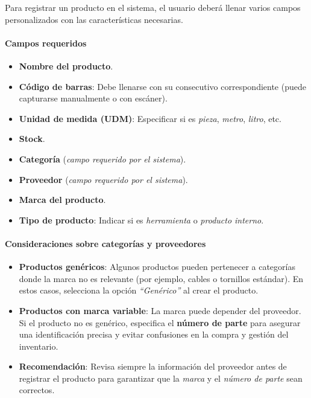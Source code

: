 \begin{justify}
Para registrar un producto en el sistema, el usuario deberá llenar varios campos personalizados con las características necesarias.
\end{justify}

\paragraph{Campos requeridos}

\begin{itemize}
  \item \textbf{Nombre del producto}.
  \item \textbf{Código de barras}: Debe llenarse con su consecutivo correspondiente (puede capturarse manualmente o con escáner).
  \item \textbf{Unidad de medida (UDM)}: Especificar si es \emph{pieza}, \emph{metro}, \emph{litro}, etc.
  \item \textbf{Stock}.
  \item \textbf{Categoría} (\emph{campo requerido por el sistema}).
  \item \textbf{Proveedor} (\emph{campo requerido por el sistema}).
  \item \textbf{Marca del producto}.
  \item \textbf{Tipo de producto}: Indicar si es \emph{herramienta} o \emph{producto interno}.
\end{itemize}


\paragraph{Consideraciones sobre categorías y proveedores}

\begin{itemize}
  \item \textbf{Productos genéricos}: Algunos productos pueden pertenecer a categorías donde la marca no es relevante (por ejemplo, cables o tornillos estándar). En estos casos, selecciona la opción \emph{“Genérico”} al crear el producto.
  \item \textbf{Productos con marca variable}: La marca puede depender del proveedor. Si el producto no es genérico, especifica el \textbf{número de parte} para asegurar una identificación precisa y evitar confusiones en la compra y gestión del inventario.
  \item \textbf{Recomendación}: Revisa siempre la información del proveedor antes de registrar el producto para garantizar que la \emph{marca} y el \emph{número de parte} sean correctos.
\end{itemize}


